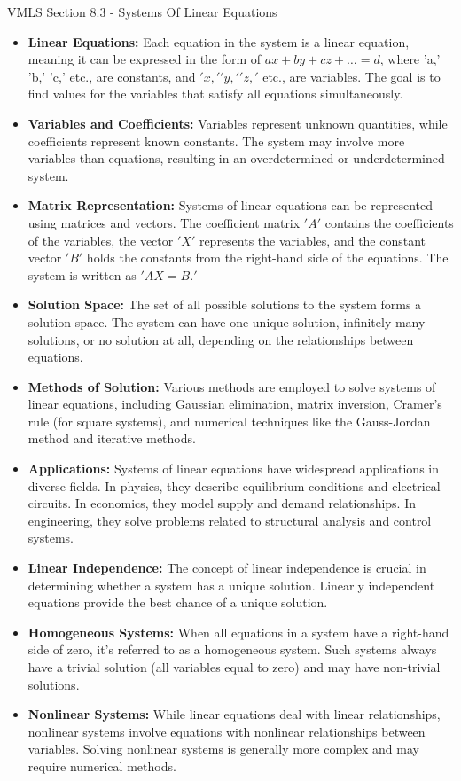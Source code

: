 \begin{notes}{VMLS Section 8.3 - Systems Of Linear Equations}
    \begin{itemize}
        \item \textbf{Linear Equations:} Each equation in the system is a linear equation, meaning it can be expressed in the form of $ax + by + cz + \dots = d$, where 'a,' 'b,' 'c,' etc., are constants, and 
        $'x,' 'y,' 'z,'$ etc., are variables. The goal is to find values for the variables that satisfy all equations simultaneously.        
        \item \textbf{Variables and Coefficients:} Variables represent unknown quantities, while coefficients represent known constants. The system may involve more variables than equations, resulting in an 
        overdetermined or underdetermined system.        
        \item \textbf{Matrix Representation:} Systems of linear equations can be represented using matrices and vectors. The coefficient matrix $'A'$ contains the coefficients of the variables, the vector 
        $'X'$ represents the variables, and the constant vector $'B'$ holds the constants from the right-hand side of the equations. The system is written as $'AX = B.'$        
        \item \textbf{Solution Space:} The set of all possible solutions to the system forms a solution space. The system can have one unique solution, infinitely many solutions, or no solution at all, 
        depending on the relationships between equations.        
        \item \textbf{Methods of Solution:} Various methods are employed to solve systems of linear equations, including Gaussian elimination, matrix inversion, Cramer's rule (for square systems), and 
        numerical techniques like the Gauss-Jordan method and iterative methods.        
        \item \textbf{Applications:} Systems of linear equations have widespread applications in diverse fields. In physics, they describe equilibrium conditions and electrical circuits. In economics, they 
        model supply and demand relationships. In engineering, they solve problems related to structural analysis and control systems.        
        \item \textbf{Linear Independence:} The concept of linear independence is crucial in determining whether a system has a unique solution. Linearly independent equations provide the best chance of a 
        unique solution.        
        \item \textbf{Homogeneous Systems:} When all equations in a system have a right-hand side of zero, it's referred to as a homogeneous system. Such systems always have a trivial solution (all 
        variables equal to zero) and may have non-trivial solutions.        
        \item \textbf{Nonlinear Systems:} While linear equations deal with linear relationships, nonlinear systems involve equations with nonlinear relationships between variables. Solving nonlinear 
        systems is generally more complex and may require numerical methods.
    \end{itemize}


\end{notes}
